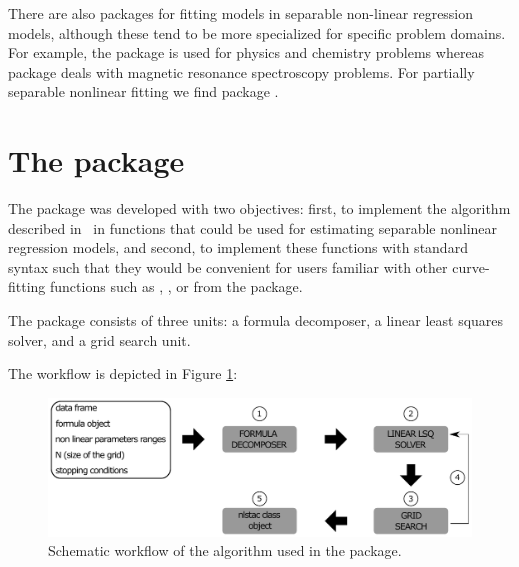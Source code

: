 There are also packages for fitting models in separable non-linear regression models, although these tend to be more specialized for specific problem domains. For example, the  package \citep{package_TIMP} is used for physics and chemistry problems whereas  package \citep{package_spant} deals with magnetic resonance spectroscopy problems. For partially separable nonlinear fitting we find  package \citep{package_psqn}. 






\section{The  package}

The  package was developed with two objectives: first, to implement the algorithm described in~\citet{tac} in functions that could be used for estimating separable nonlinear regression models, and second, to implement these functions with standard syntax such that they would be convenient for users familiar with other curve-fitting functions such as , , or  from the  package.


The package consists of three units: a formula decomposer, a linear least squares solver, and a grid search unit. 

The workflow is depicted in Figure \ref{fig:workflow}: 

\begin{figure}[htp]
\includegraphics[width=\linewidth]{workflow}
\caption{Schematic workflow of the algorithm used in the  package.}
\label{fig:workflow}
\end{figure}

